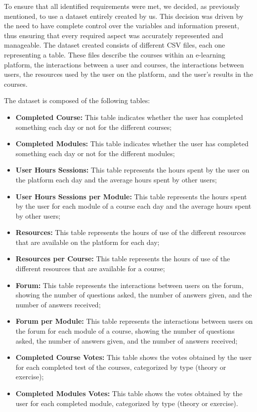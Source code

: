 To ensure that all identified requirements were met, we decided, 
as previously mentioned, to use a dataset entirely created by us. This decision was driven by the need to have 
complete control over the variables and information present, thus ensuring that every required aspect was 
accurately represented and manageable. The dataset created consists of different CSV files, each one representing a table. 
These files describe the courses within an e-learning platform, the interactions between a user and courses,
the interactions between users, the resources used by the user on the platform, and the user's
results in the courses.


The dataset is composed of the following tables:
\begin{itemize}
    \item 
        \textbf{Completed Course:} This table indicates whether the user has completed something each 
        day or not for the different courses;
    \item 
        \textbf{Completed Modules:} This table indicates whether the user has completed something each 
        day or not for the different modules;
    \item 
        \textbf{User Hours Sessions:} This table represents the hours spent by the user on the platform 
        each day and the average hours spent by other users;
    \item 
        \textbf{User Hours Sessions per Module:} This table represents the hours spent by the user for each module
        of a course each day and the average hours spent by other users;
    \item 
        \textbf{Resources:} This table represents the hours of use of the different resources that are
        available on the platform for each day;
    \item 
        \textbf{Resources per Course:} This table represents the hours of use of the different resources that are
        available for a course;
    \item 
        \textbf{Forum:} This table represents the interactions between users on the forum, showing the number
        of questions asked, the number of answers given, and the number of answers received;
    \item 
        \textbf{Forum per Module:} This table represents the interactions between users on the forum for each module of a course, showing the number
        of questions asked, the number of answers given, and the number of answers received;
    \item 
        \textbf{Completed Course Votes:} This table shows the votes obtained by the user for each completed test of the courses, 
        categorized by type (theory or exercise);
    \item 
        \textbf{Completed Modules Votes:} This table shows the votes obtained by the user for each completed module, 
        categorized by type (theory or exercise).
\end{itemize}